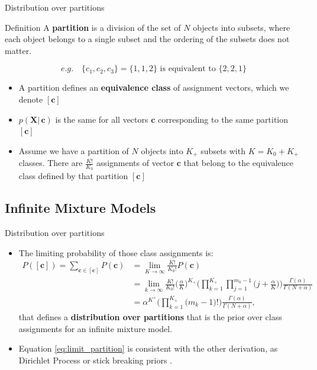 \documentclass[aspectratio=169,xcolor=dvipsnames]{beamer}
\newcommand{\vecc}{\textbf{c}}
\newcommand{\matx}{\textbf{X}}
\newcommand{\aOverK}{\frac{\alpha}{K}}
\begin{document}
\begin{frame}{Distribution over partitions}
\setlength{\leftmargini}{0.2cm}
\begin{block}{Definition}
A \textbf{partition} is a division of the set of $N$ objects into subsets, where each object belongs to a single subset and the ordering of the subsets does not matter.
\end{block}
\pause
\begin{equation*}
    e.g. \quad \{c_1, c_2, c_3\} = \{1, 1, 2\} \text{ is equivalent to } \{2, 2, 1\}
\end{equation*}
\pause
\begin{itemize}[<+->]
\item A partition defines an \textbf{equivalence class} of assignment vectors, which we denote $[\vecc]$
\item $p(\matx |\,\vecc)$ is the same for all vectors $\vecc$ corresponding to the same partition $[\vecc]$
\item Assume we have a partition of $N$ objects into $K_+$ subsets with $K = K_0 + K_+$ classes. There are $\frac{K!}{K_0}$ assignments of vector $\vecc$ that belong to the equivalence class defined by that partition  $[\vecc]$

\end{itemize}  
\end{frame}
\subsection{Infinite Mixture Models}
\begin{frame}{Distribution over partitions}
\setlength{\leftmargini}{0.2cm}
\begin{itemize}[<+->]
\item The limiting probability of those class assignments is:
\begin{align}
    P([\vecc]) = \sum_{\vecc\in[\vecc]}P(\vecc) &= \lim_{K\rightarrow\infty} \frac{K!}{K_0!}P(\vecc) \nonumber \\
    &=\lim_{k\rightarrow\infty} \frac{K!}{K_0!} \Big(\aOverK\Big)^{K_+} \bigg( \prod_{k=1}^{K_{+}} \prod_{j=1}^{m_k-1}\Big(j+\aOverK\Big) \bigg) \frac{\Gamma(\alpha)}{\Gamma(N+\alpha)} \nonumber \\
    &=  \alpha^{K^+} \bigg( \prod_{k=1}^{K_{+}}\Big(m_k - 1\Big)! \bigg) \frac{\Gamma(\alpha)}{\Gamma(N+\alpha)}, \label{eq:limit_partition}
\end{align}
that defines a \textbf{distribution over partitions} that is the prior over class assignments for an infinite mixture model.
\item Equation \ref{eq:limit_partition} is consistent with the other derivation, as Dirichlet Process \citep{blackwel_mcq_73} or stick breaking priors \citep{sethuraman94}.
\end{itemize}  
\end{frame}
\end{document}
